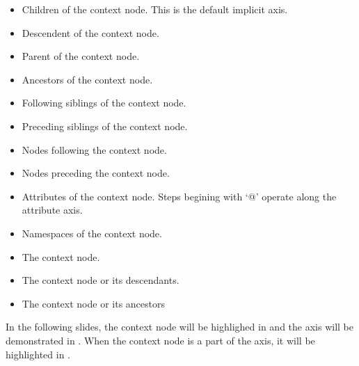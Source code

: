 \documentclass[20pt,landscape,headrule,footrule]{foils}
\begin{document}
\begin{minipage}{\textwidth}
\small
\begin{itemize}
  \item {} 
    Children of the context node.  This is the default implicit axis.
  \item {} 
    Descendent of the context node.  
  \item {} 
    Parent of the context node.
  \item {} 
    Ancestors of the context node.
  \item {} 
    Following siblings of the context node.
  \item {} 
    Preceding siblings of the context node.
  \item {} 
    Nodes following the context node.
  \item {} 
    Nodes preceding the context node.
  \item {} 
    Attributes of the context node.  Steps begining with `@' operate
    along the attribute axis.
  \item {} 
    Namespaces of the context node.  
  \item {} 
    The context node. 
  \item {} 
    The context node or its descendants.
  \item {} 
    The context node or its ancestors
\end{itemize}
\end{minipage}



In the following slides, the context node will be highlighed
in  and the axis will be demonstrated in
.  When the context node is a part of the axis,
it will be highlighted in .



\begin{codelisting}
\end{codelisting}
\end{document}
